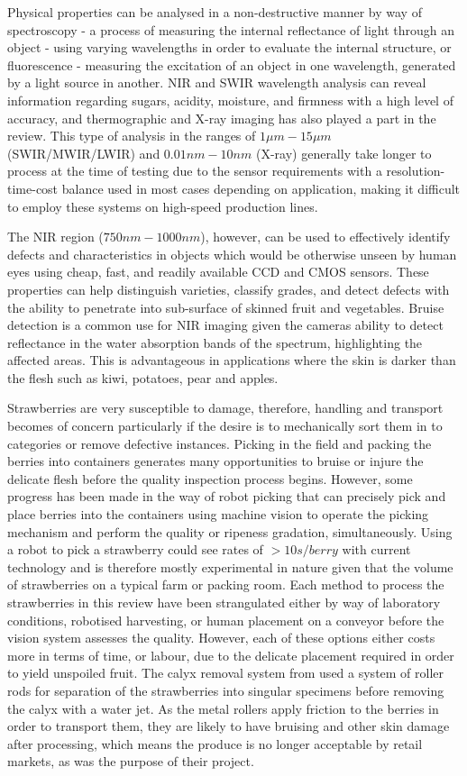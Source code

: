 \documentclass[fleqn,twoside,12pt]{report}
\begin{document}
Physical properties can be analysed in a non-destructive manner by way of spectroscopy - a process of measuring the internal reflectance of light through an object - using varying wavelengths in order to evaluate the internal structure, or fluorescence - measuring the excitation of an object in one wavelength, generated by a light source in another. NIR and SWIR wavelength analysis can reveal information regarding sugars, acidity, moisture, and firmness with a high level of accuracy, and thermographic and X-ray imaging has also played a part in the review. This type of analysis in the ranges of $1\mu m-15\mu m$ (SWIR/MWIR/LWIR) and $0.01nm-10nm$ (X-ray) generally take longer to process at the time of testing due to the sensor requirements with a resolution-time-cost balance used in most cases depending on application, making it difficult to employ these systems on high-speed production lines.  

The NIR region ($750nm-1000nm$), however, can be used to effectively identify defects and characteristics in objects which would be otherwise unseen by human eyes using cheap, fast, and readily available CCD and CMOS sensors. These properties can help distinguish varieties, classify grades, and detect defects with the ability to penetrate into sub-surface of skinned fruit and vegetables. Bruise detection is a common use for NIR imaging given the cameras ability to detect reflectance in the water absorption bands of the spectrum, highlighting the affected areas. This is advantageous in applications where the skin is darker than the flesh such as kiwi, potatoes, pear and apples.

Strawberries are very susceptible to damage, therefore, handling and transport becomes of concern particularly if the desire is to mechanically sort them in to categories or remove defective instances. Picking in the field and packing the berries into containers generates many opportunities to bruise or injure the delicate flesh before the quality inspection process begins. However, some progress has been made in the way of robot picking that can precisely pick and place berries into the containers using machine vision to operate the picking mechanism and perform the quality or ripeness gradation, simultaneously. Using a robot to pick a strawberry could see rates of $>10s/berry$ with current technology and is therefore mostly experimental in nature given that the volume of strawberries on a typical farm or packing room. Each method to process the strawberries in this review have been strangulated either by way of laboratory conditions, robotised harvesting, or human placement on a conveyor before the vision system assesses the quality. However, each of these options either costs more in terms of time, or labour, due to the delicate placement required in order to yield unspoiled fruit. The calyx removal system from \cite{lin} used a system of roller rods for separation of the strawberries into singular specimens before removing the calyx with a water jet. As the metal rollers apply friction to the berries in order to transport them, they are likely to have bruising and other skin damage after processing, which means the produce is no longer acceptable by retail markets, as was the purpose of their project. 
\end{document}
